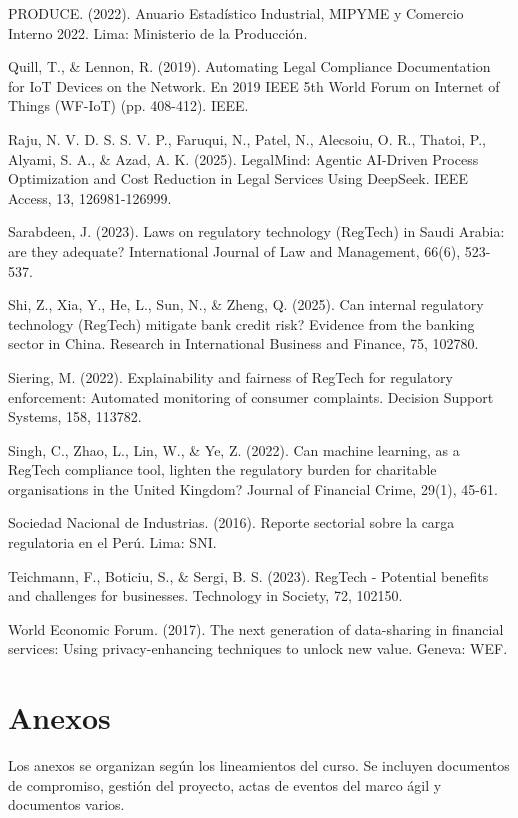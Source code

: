 \documentclass[12pt,a4paper,oneside]{report}
\begin{document}
PRODUCE. (2022). Anuario Estadístico Industrial, MIPYME y Comercio Interno 2022. Lima: Ministerio de la Producción.

Quill, T., \& Lennon, R. (2019). Automating Legal Compliance Documentation for IoT Devices on the Network. En 2019 IEEE 5th World Forum on Internet of Things (WF-IoT) (pp. 408-412). IEEE.

Raju, N. V. D. S. S. V. P., Faruqui, N., Patel, N., Alecsoiu, O. R., Thatoi, P., Alyami, S. A., \& Azad, A. K. (2025). LegalMind: Agentic AI-Driven Process Optimization and Cost Reduction in Legal Services Using DeepSeek. IEEE Access, 13, 126981-126999.

Sarabdeen, J. (2023). Laws on regulatory technology (RegTech) in Saudi Arabia: are they adequate? International Journal of Law and Management, 66(6), 523-537.

Shi, Z., Xia, Y., He, L., Sun, N., \& Zheng, Q. (2025). Can internal regulatory technology (RegTech) mitigate bank credit risk? Evidence from the banking sector in China. Research in International Business and Finance, 75, 102780.

Siering, M. (2022). Explainability and fairness of RegTech for regulatory enforcement: Automated monitoring of consumer complaints. Decision Support Systems, 158, 113782.

Singh, C., Zhao, L., Lin, W., \& Ye, Z. (2022). Can machine learning, as a RegTech compliance tool, lighten the regulatory burden for charitable organisations in the United Kingdom? Journal of Financial Crime, 29(1), 45-61.

Sociedad Nacional de Industrias. (2016). Reporte sectorial sobre la carga regulatoria en el Perú. Lima: SNI.

Teichmann, F., Boticiu, S., \& Sergi, B. S. (2023). RegTech - Potential benefits and challenges for businesses. Technology in Society, 72, 102150.

World Economic Forum. (2017). The next generation of data-sharing in financial services: Using privacy-enhancing techniques to unlock new value. Geneva: WEF.


\appendix
\chapter{Anexos}\label{cap:anexos}

Los anexos se organizan según los lineamientos del curso. Se incluyen documentos de compromiso, gestión del proyecto, actas de eventos del marco ágil y documentos varios.
\end{document}
